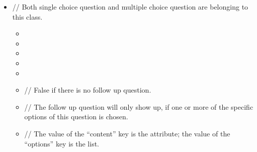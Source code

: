 \documentclass[a4paper]{scrreprt}
\begin{document}
\begin{itemize}
                    \item {}
                        \par // Both single choice question and multiple choice question are belonging to this class.
                        \begin{itemize}
                            \item {}
                            \item {}
                            \item {}
                            \item {}
                            \item {}
                            \item {}
                                \par // False if there is no follow up question.
                            \item {}
                                \par // The follow up question will only show up, if one or more of the specific options of this question is chosen.
                            \item {}
                                \par // The value of the “content” key is the  attribute; the value of the “options” key is the  list.
                        \end{itemize}


\end{itemize}
\end{document}
